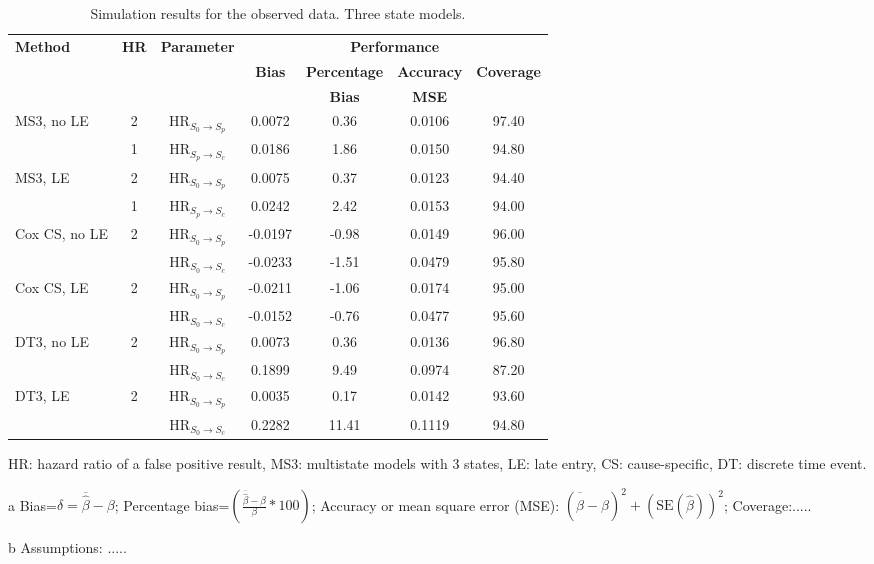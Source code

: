 \begin{table}[h!]
\footnotesize
\centering
\begin{threeparttable}
\begin{tabular}{l|c|c|c|c|c|c}
\toprule
\textbf{Method} &   \textbf{HR} & \textbf{Parameter} &\multicolumn{4}{c}{\textbf{Performance}\tnote{a,b}} \\ \cline{4-7}
& & & \textbf{Bias} & \textbf{Percentage} & \textbf{Accuracy}  &  \textbf{Coverage}  \\
& & & & \textbf{Bias} &   \textbf{MSE}\\
\midrule
\multirow{2}{*}{\parbox{0.2\textwidth}{MS3, no LE}} & 2 & HR$_{S_0 \rightarrow S_p}$ &0.0072&0.36&0.0106&	97.40\\
&1 & HR$_{S_p \rightarrow S_c}$& 0.0186	&1.86&0.0150&	94.80\\
\cmidrule{1-7}
\multirow{2}{*}{\parbox{0.2\textwidth}{MS3, LE}} & 2 & HR$_{S_0 \rightarrow S_p}$ &0.0075 &0.37&0.0123&	94.40\\
& 1 & HR$_{S_p \rightarrow S_c}$ &0.0242&2.42	&0.0153	&94.00\\
\midrule
\multirow{2}{*}{\parbox{0.2\textwidth}{Cox CS, no LE}} & \multirow{2}{*}{2} & HR$_{S_0 \rightarrow S_p}$ &-0.0197 &	-0.98&0.0149& 96.00\\
&& HR$_{S_0 \rightarrow S_c}$ & -0.0233&	-1.51 &0.0479	& 95.80\\
\cmidrule{1-7}
\multirow{2}{*}{\parbox{0.2\textwidth}{Cox CS, LE}} & \multirow{2}{*}{2} & HR$_{S_0 \rightarrow S_p}$ &-0.0211 &-1.06 &	0.0174 &	95.00\\
&& HR$_{S_0 \rightarrow S_c}$ &-0.0152	&-0.76	&0.0477&95.60\\
\midrule
\multirow{2}{*}{\parbox{0.2\textwidth}{DT3, no LE}} & \multirow{2}{*}{2} & HR$_{S_0 \rightarrow S_p}$ & 0.0073	&0.36	&0.0136&	96.80\\
&& HR$_{S_0 \rightarrow S_c}$ &0.1899	&9.49	&0.0974	&87.20\\
\cmidrule{1-7}
\multirow{2}{*}{\parbox{0.2\textwidth}{DT3, LE}} & \multirow{2}{*}{2} & HR$_{S_0 \rightarrow S_p}$ &0.0035&	0.17	&0.0142&	93.60\\
&& HR$_{S_0 \rightarrow S_c}$ &0.2282&	11.41&	0.1119&	94.80\\
\bottomrule
\end{tabular}
\begin{tablenotes}\scriptsize
	\item HR: hazard ratio of a false positive result, MS3: multistate models with 3 states, LE: late entry, CS: cause-specific, DT: discrete time event.
	\item[a] Bias=$\delta=\overline{\hat\beta}-\beta$; Percentage bias=$\left(\frac{\overline{\hat\beta}-\beta}{\beta}*100 \right)$; Accuracy or mean square error (MSE): $(\overline{\hat\beta}-\beta)^2+(\mbox{SE}(\hat \beta))^2$; 	 Coverage:..... 
	\item[b] Assumptions: .....
\end{tablenotes}
\end{threeparttable}
\caption{Simulation results for the observed data. Three state models.}
\label{tab:HRFP_observed3}
\end{table}



